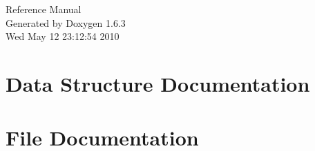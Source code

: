 \documentclass[a4paper]{article}
\begin{document}
\hypersetup{pageanchor=false}
\begin{titlepage}
\vspace*{7cm}
\begin{center}
{\Large Reference Manual}\\
\vspace*{1cm}
{\large Generated by Doxygen 1.6.3}\\
\vspace*{0.5cm}
{\small Wed May 12 23:12:54 2010}\\
\end{center}
\end{titlepage}
\tableofcontents
{}
\hypersetup{pageanchor=true}
\section{Data Structure Documentation}












\section{File Documentation}





\printindex
\end{document}
